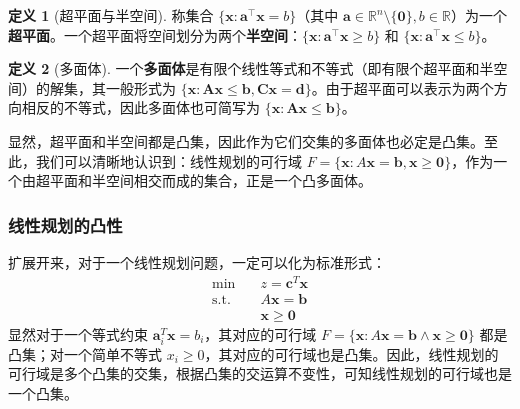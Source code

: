 \documentclass[12pt]{article}
\theoremstyle{plain}
\theoremstyle{definition}
\newtheorem{dfn}{定义}[subsection]
\newcommand{\st}{\mathrel{\text{s.t.}}}
\begin{document}
\begin{dfn}[超平面与半空间]
    称集合 $\{\bm{x}: \bm{a}^\top \bm{x} = b\}$（其中 $\bm{a} \in \mathbb{R}^n \setminus \{\bm{0}\}, b \in \mathbb{R}$）为一个\textbf{超平面}。一个超平面将空间划分为两个\textbf{半空间}：$\{\bm{x}: \bm{a}^\top \bm{x} \ge b\}$ 和 $\{\bm{x}: \bm{a}^\top \bm{x} \le b\}$。
\end{dfn}

\begin{dfn}[多面体]
    一个\textbf{多面体}是有限个线性等式和不等式（即有限个超平面和半空间）的解集，其一般形式为 $\{\bm{x}: \bm{A}\bm{x} \le \bm{b}, \bm{C}\bm{x} = \bm{d}\}$。由于超平面可以表示为两个方向相反的不等式，因此多面体也可简写为 $\{\bm{x}: \bm{A}\bm{x} \le \bm{b}\}$。
\end{dfn}
显然，超平面和半空间都是凸集，因此作为它们交集的多面体也必定是凸集。至此，我们可以清晰地认识到：线性规划的可行域 $F = \{\bm{x} : A\bm{x} = \bm{b}, \bm{x} \geq \bm{0}\}$，作为一个由超平面和半空间相交而成的集合，正是一个凸多面体。

\subsubsection{线性规划的凸性}\label{subsubsec:lp_convexity}

扩展开来，对于一个线性规划问题，一定可以化为标准形式：
\begin{align*}
    \min \quad & z = \bm{c}^T \bm{x} \\
    \st \quad & A\bm{x} = \bm{b} \\
    & \bm{x} \geq \bm{0}
\end{align*}
显然对于一个等式约束 $\bm{a}_i^T\bm{x} = b_i$，其对应的可行域 $F = \{\bm{x} : A\bm{x} = \bm{b} \land \bm{x} \geq \bm{0}\}$ 都是凸集；对一个简单不等式 $x_i \geq 0$，其对应的可行域也是凸集。因此，线性规划的可行域是多个凸集的交集，根据凸集的交运算不变性，可知线性规划的可行域也是一个凸集。
\end{document}
